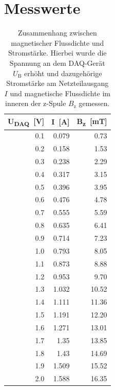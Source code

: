 \documentclass[page,pdftex,12pt,a4paper,twoside,openright]{scrbook}
\begin{document}
\section{Messwerte}
\label{sec:org61304d4}
\begin{table}[htbp]
\caption{\label{tab-B}
Zusammenhang zwischen magnetischer Flussdichte und Stromstärke. Hierbei wurde die Spannung an dem DAQ-Gerät \(U_\mathrm{B}\) erhöht und dazugehörige Stromstärke am Netzteilausgang \(I\) und magnetische Flussdichte im inneren der z-Spule \(B_\mathrm{z}\) gemessen.}
\centering
\begin{tabular}{r|r|r}
U\textsubscript{DAQ}~[\si{\volt}] & I~[\si{\ampere}] & B\textsubscript{z}~[\si{\milli\tesla}]\\
\hline
0.1 & 0.079 & 0.73\\
0.2 & 0.158 & 1.53\\
0.3 & 0.238 & 2.29\\
0.4 & 0.317 & 3.15\\
0.5 & 0.396 & 3.95\\
0.6 & 0.476 & 4.78\\
0.7 & 0.555 & 5.59\\
0.8 & 0.635 & 6.41\\
0.9 & 0.714 & 7.23\\
1.0 & 0.793 & 8.05\\
1.1 & 0.873 & 8.88\\
1.2 & 0.953 & 9.70\\
1.3 & 1.032 & 10.52\\
1.4 & 1.111 & 11.36\\
1.5 & 1.191 & 12.20\\
1.6 & 1.271 & 13.01\\
1.7 & 1.35 & 13.85\\
1.8 & 1.43 & 14.69\\
1.9 & 1.509 & 15.52\\
2.0 & 1.588 & 16.35\\
\end{tabular}
\end{table}
\end{document}
